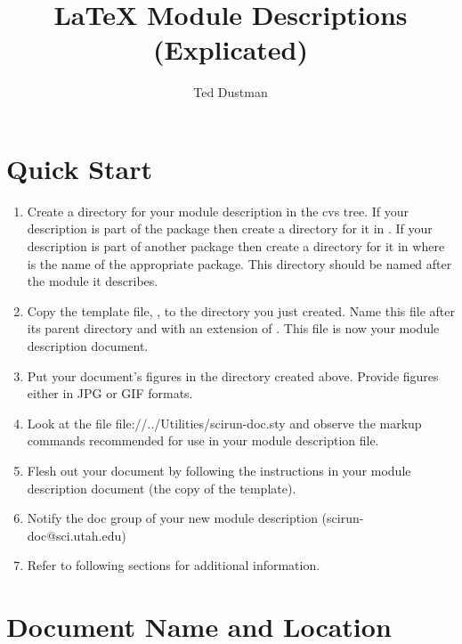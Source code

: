 \documentclass[11pt]{article}
\begin{document}
\begin{htmlonly}

\end{htmlonly}

\title{\LaTeX{} Module Descriptions (Explicated)}
\author{Ted Dustman}
\maketitle 
\newpage
\tableofcontents
\newpage


\section{Quick Start}

\begin{enumerate}
\item Create a directory for your module description in the cvs tree.  If your
  description is part of the \sr{} package then create a directory for it
  in .  If your description is part of another
  package then create a directory for it in
   where  is
  the name of the appropriate package.  This directory should be named
  after the module it describes.
\item Copy the template file,
  , to the directory you
  just created.  Name this file after its parent directory and with an
  extension of .  This file is now your module description
  document.
\item Put your document's figures in the directory created above.  Provide
  figures either in JPG or GIF formats.
\item Look at the file 
  {file://../Utilities/scirun-doc.sty} and observe the markup
  commands recommended for use in your module description file.
\item Flesh out your document by following the instructions in your
  module description document (the copy of the template).
\item Notify the doc group of your new module description
  (scirun-doc@sci.utah.edu)
\item Refer to following sections for additional information.
\end{enumerate}


\section{Document Name and Location}
\end{document}

